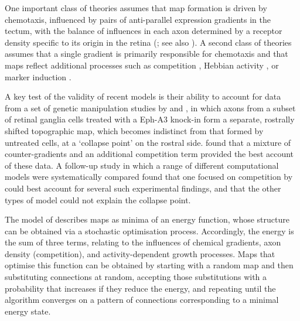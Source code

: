 \documentclass[9pt,lineno,draft]{elife}
\newcommand{\redcmnt}[1]{\textcolor{colcmnt}{#1}}
\begin{document}
One important class of theories assumes that map formation is driven by chemotaxis, influenced by pairs of anti-parallel expression gradients in the tectum, with the balance of influences in each axon determined by a receptor density specific to its origin in the retina (\citealp{Gierer1983,Gierer1987,Simpson2011}; see also \citealp{Karbowski2004,James2020}). A second class of theories assumes that a single gradient is primarily responsible for chemotaxis and that maps reflect additional processes such as competition \citep{Triplett2011}, Hebbian activity \citep{Tsigankov2006,Tsigankov2010}, or marker induction \citep{Prestige1975,Willshaw2006}.

A key test of the validity of recent models is their ability to account for data from a set of genetic manipulation studies by \cite{brown_topographic_2000} and \cite{reber_relative_2004}, in which axons from a subset of retinal ganglia cells treated with a Eph-A3 knock-in form a separate, rostrally shifted topographic map, which becomes indistinct from that formed by untreated cells, at a ‘collapse point’ on the rostral side. \cite{Sterratt2013} found that a mixture of counter-gradients and an additional competition term provided the best account of these data. A follow-up study in which a range of different computational models were systematically compared \citep{hjorth_quantitative_2015} found that \redcmnt{one focused on competition
by \cite{Triplett2011}} could best account for several such experimental findings, and that the other types of model could not explain the collapse point.

\redcmnt{The model of \cite{Triplett2011} describes maps as minima of an energy function}, whose structure can be obtained via a stochastic optimisation process. Accordingly, the energy is the sum of three terms, relating to the influences of chemical gradients, axon density (competition), and activity-dependent growth processes. Maps that optimise this function can be obtained by starting with a random map and then substituting connections at random, accepting those substitutions with a probability that increases if they reduce the energy, and repeating until the algorithm converges on a pattern of connections corresponding to a minimal energy state.
\end{document}
